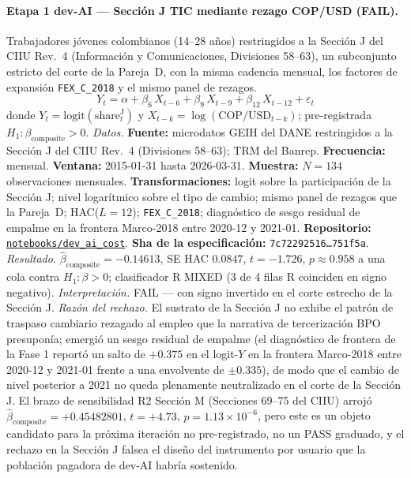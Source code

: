 \documentclass[11pt,a4paper]{article}
\theoremstyle{plain}
\begin{document}
\paragraph{Etapa 1 dev-AI --- Sección J TIC mediante rezago COP/USD (FAIL).}
Trabajadores jóvenes colombianos (14--28 años) restringidos a la Sección J del CIIU Rev.~4 (Información y Comunicaciones, Divisiones 58--63), un subconjunto estricto del corte de la Pareja~D, con la misma cadencia mensual, los factores de expansión \texttt{FEX\_C\_2018} y el mismo panel de rezagos.
\[ Y_t = \alpha + \beta_6\, X_{t-6} + \beta_9\, X_{t-9} + \beta_{12}\, X_{t-12} + \varepsilon_t \]
donde \(Y_t = \mathrm{logit}(\mathrm{share}_t^{\mathrm{J}})\) y \(X_{t-k} = \log(\mathrm{COP}/\mathrm{USD}_{t-k})\); pre-registrada \(H_1: \beta_{\mathrm{composite}} > 0\).
\textit{Datos.} \textbf{Fuente:} microdatos GEIH del DANE restringidos a la Sección J del CIIU Rev.~4 (Divisiones 58--63); TRM del Banrep. \textbf{Frecuencia:} mensual. \textbf{Ventana:} 2015-01-31 hasta 2026-03-31. \textbf{Muestra:} \(N = 134\) observaciones mensuales. \textbf{Transformaciones:} logit sobre la participación de la Sección J; nivel logarítmico sobre el tipo de cambio; mismo panel de rezagos que la Pareja~D; HAC(\(L=12\)); \texttt{FEX\_C\_2018}; diagnóstico de sesgo residual de empalme en la frontera Marco-2018 entre 2020-12 y 2021-01. \textbf{Repositorio:} \href{https://github.com/JMSBPP/abrigo-analytics/tree/master/notebooks/dev_ai_cost}{\texttt{notebooks/dev\_ai\_cost}}. \textbf{Sha de la especificación:} \texttt{7c72292516\ldots 751f5a}.
\textit{Resultado.} \(\hat{\beta}_{\mathrm{composite}} = -0.14613\), SE HAC \(0.0847\), \(t = -1.726\), \(p \approx 0.958\) a una cola contra \(H_1: \beta > 0\); clasificador R MIXED (3 de 4 filas R coinciden en signo negativo).
\textit{Interpretación.} FAIL --- con signo invertido en el corte estrecho de la Sección J.
\textit{Razón del rechazo.} El sustrato de la Sección J no exhibe el patrón de traspaso cambiario rezagado al empleo que la narrativa de tercerización BPO presuponía; emergió un sesgo residual de empalme (el diagnóstico de frontera de la Fase 1 reportó un salto de \(+0.375\) en el logit-\(Y\) en la frontera Marco-2018 entre 2020-12 y 2021-01 frente a una envolvente de \(\pm 0.335\)), de modo que el cambio de nivel posterior a 2021 no queda plenamente neutralizado en el corte de la Sección J. El brazo de sensibilidad R2 Sección M (Secciones 69--75 del CIIU) arrojó \(\hat{\beta}_{\mathrm{composite}} = +0.45482801\), \(t = +4.73\), \(p = 1.13 \times 10^{-6}\), pero este es un objeto candidato para la próxima iteración no pre-registrado, no un PASS graduado, y el rechazo en la Sección J falsea el diseño del instrumento por usuario que la población pagadora de dev-AI habría sostenido.
\end{document}
